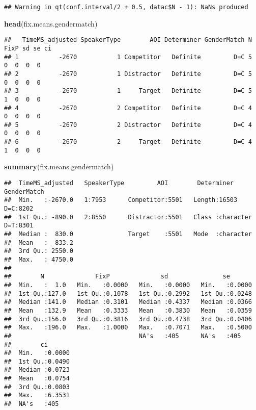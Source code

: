 \documentclass[
]{article}
\newenvironment{Shaded}{\begin{snugshade}}{\end{snugshade}}
\newcommand{\FunctionTok}[1]{\textcolor[rgb]{0.13,0.29,0.53}{\textbf{#1}}}
\newcommand{\NormalTok}[1]{#1}
\begin{document}
\begin{verbatim}
## Warning in qt(conf.interval/2 + 0.5, datac$N - 1): NaNs produced
\end{verbatim}

\begin{Shaded}
\begin{Highlighting}[]
\FunctionTok{head}\NormalTok{(fix.means.gendermatch)}
\end{Highlighting}
\end{Shaded}

\begin{verbatim}
##   TimeMS_adjusted SpeakerType        AOI Determiner GenderMatch N FixP sd se ci
## 1           -2670           1 Competitor   Definite         D=C 5    0  0  0  0
## 2           -2670           1 Distractor   Definite         D=C 5    0  0  0  0
## 3           -2670           1     Target   Definite         D=C 5    1  0  0  0
## 4           -2670           2 Competitor   Definite         D=C 4    0  0  0  0
## 5           -2670           2 Distractor   Definite         D=C 4    0  0  0  0
## 6           -2670           2     Target   Definite         D=C 4    1  0  0  0
\end{verbatim}

\begin{Shaded}
\begin{Highlighting}[]
\FunctionTok{summary}\NormalTok{(fix.means.gendermatch)}
\end{Highlighting}
\end{Shaded}

\begin{verbatim}
##  TimeMS_adjusted   SpeakerType         AOI        Determiner        GenderMatch
##  Min.   :-2670.0   1:7953      Competitor:5501   Length:16503       D=C:8202   
##  1st Qu.: -890.0   2:8550      Distractor:5501   Class :character   D=T:8301   
##  Median :  830.0               Target    :5501   Mode  :character              
##  Mean   :  833.2                                                               
##  3rd Qu.: 2550.0                                                               
##  Max.   : 4750.0                                                               
##                                                                                
##        N              FixP              sd               se        
##  Min.   :  1.0   Min.   :0.0000   Min.   :0.0000   Min.   :0.0000  
##  1st Qu.:127.0   1st Qu.:0.1078   1st Qu.:0.2992   1st Qu.:0.0248  
##  Median :141.0   Median :0.3101   Median :0.4337   Median :0.0366  
##  Mean   :132.9   Mean   :0.3333   Mean   :0.3830   Mean   :0.0359  
##  3rd Qu.:156.0   3rd Qu.:0.3816   3rd Qu.:0.4738   3rd Qu.:0.0406  
##  Max.   :196.0   Max.   :1.0000   Max.   :0.7071   Max.   :0.5000  
##                                   NA's   :405      NA's   :405     
##        ci        
##  Min.   :0.0000  
##  1st Qu.:0.0490  
##  Median :0.0723  
##  Mean   :0.0754  
##  3rd Qu.:0.0803  
##  Max.   :6.3531  
##  NA's   :405
\end{verbatim}
\end{document}
